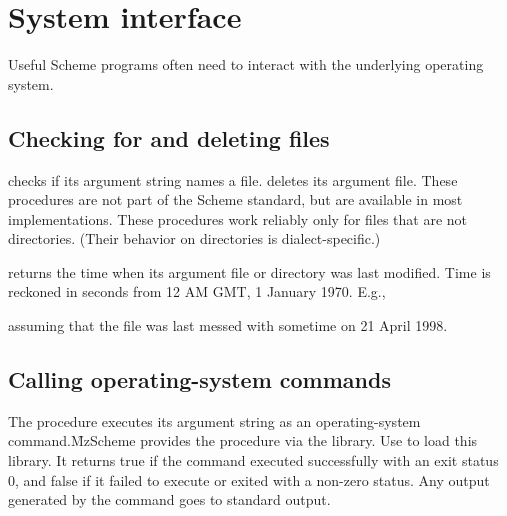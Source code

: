 \chapter{System interface}
\label{os}

Useful Scheme programs often need to interact with the
underlying operating system. 


\section{Checking for and deleting files}

 checks if its argument string names
a file.   deletes its argument file.
These procedures are not part of the Scheme standard,
but are available in most implementations.  These
procedures work reliably only for files that are not
directories.  (Their behavior on directories is
dialect-specific.) 


 returns the time when its 
argument file or directory was last modified.  Time is
reckoned in seconds from 12 AM GMT, 1 January 1970.
E.g.,


\n assuming that the file  was last messed with 
sometime on 21 April 1998.

\section{Calling operating-system commands}

The  procedure executes its argument string
as an operating-system command.\f{MzScheme provides the
 procedure via the  library.  Use  to load this library.}   It returns true if the
command executed successfully with an exit status 0,
and false if it failed to execute or exited with a
non-zero status.  Any output generated by the command
goes to standard output.

